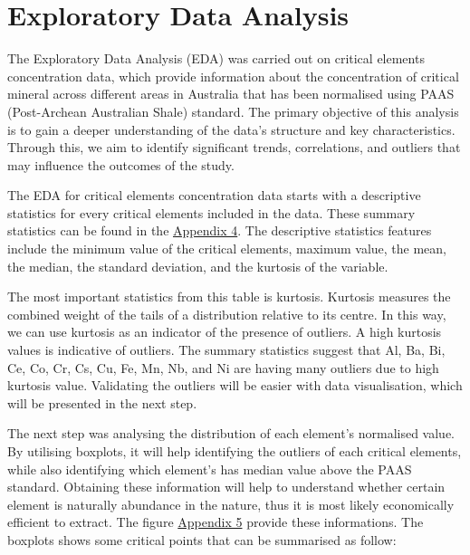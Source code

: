 \documentclass[11pt,a4paper,]{article}
\begin{document}
\section{Exploratory Data Analysis}\label{exploratory-data-analysis}

The Exploratory Data Analysis (EDA) was carried out on critical elements concentration data, which provide information about the concentration of critical mineral across different areas in Australia that has been normalised using PAAS (Post-Archean Australian Shale) standard. The primary objective of this analysis is to gain a deeper understanding of the data's structure and key characteristics. Through this, we aim to identify significant trends, correlations, and outliers that may influence the outcomes of the study.

The EDA for critical elements concentration data starts with a descriptive statistics for every critical elements included in the data. These summary statistics can be found in the \hyperref[sec-appendixfour]{Appendix 4}. The descriptive statistics features include the minimum value of the critical elements, maximum value, the mean, the median, the standard deviation, and the kurtosis of the variable.

The most important statistics from this table is kurtosis. Kurtosis measures the combined weight of the tails of a distribution relative to its centre. In this way, we can use kurtosis as an indicator of the presence of outliers. A high kurtosis values is indicative of outliers. The summary statistics suggest that Al, Ba, Bi, Ce, Co, Cr, Cs, Cu, Fe, Mn, Nb, and Ni are having many outliers due to high kurtosis value. Validating the outliers will be easier with data visualisation, which will be presented in the next step.

The next step was analysing the distribution of each element's normalised value. By utilising boxplots, it will help identifying the outliers of each critical elements, while also identifying which element's has median value above the PAAS standard. Obtaining these information will help to understand whether certain element is naturally abundance in the nature, thus it is most likely economically efficient to extract. The figure \hyperref[sec-appendixfive]{Appendix 5} provide these informations. The boxplots shows some critical points that can be summarised as follow:
\end{document}
